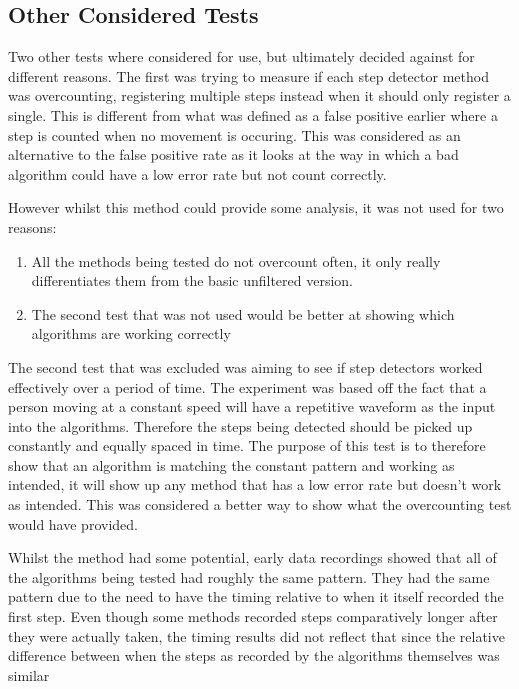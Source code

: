 \documentclass[12pt,a4paper]{report}
\begin{document}
\subsection{Other Considered Tests}

Two other tests where considered for use, but ultimately decided against for different reasons. The first was trying to measure if each step detector method was overcounting, registering multiple steps instead when it should only register a single. This is different from what was defined as a false positive earlier where a step is counted when no movement is occuring. This was considered as an alternative to the false positive rate as it looks at the way in which a bad algorithm could have a low error rate but not count correctly. 

However whilst this method could provide some analysis, it was not used for two reasons:

\begin{enumerate}
	\item All the methods being tested do not overcount often, it only really differentiates them from the basic unfiltered version.
	\item The second test that was not used would be better at showing which algorithms are working correctly
\end{enumerate}

The second test that was excluded was aiming to see if step detectors worked effectively over a period of time. The experiment was based off the fact that a person moving at a constant speed will have a repetitive waveform as the input into the algorithms. Therefore the steps being detected should be picked up constantly and equally spaced in time. The purpose of this test is to therefore show that an algorithm is matching the constant pattern and working as intended, it will show up any method that has a low error rate but doesn't work as intended. This was considered a better way to show what the overcounting test would have provided.

Whilst the method had some potential, early data recordings showed that all of the algorithms being tested had roughly the same pattern. They had the same pattern due to the need to have the timing relative to when it itself recorded the first step. Even though some methods recorded steps comparatively longer after they were actually taken, the timing results did not reflect that since the relative difference between when the steps as recorded by the algorithms themselves was similar
\end{document}
